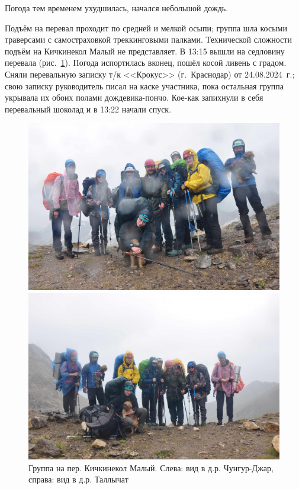Погода тем временем ухудшилась, начался небольшой дождь.

Подъём на перевал проходит по средней и мелкой осыпи; группа шла косыми траверсами с самостраховкой треккинговыми палками. Технической сложности подъём на Кичкинекол Малый не представляет.
В 13:15 вышли на седловину перевала (рис.~\ref{fig:DSC_0239}). Погода испортилась вконец, пошёл косой ливень с градом. Сняли перевальную записку т/к <<Крокус>> (г.~Краснодар) от 24.08.2024~г.; свою записку руководитель писал на каске участника, пока остальная группа укрывала их обоих полами дождевика-пончо. Кое-как запихнули в себя перевальный шоколад и в 13:22 начали спуск.


\begin{figure}[h!]
	\centering
	\begin{minipage}[h]{0.48\linewidth}
		\includegraphics[width=0.99\linewidth]{../pics/DSC_0239.jpg}
	\end{minipage}
	\quad
	\begin{minipage}[h]{0.48\linewidth}
		\includegraphics[width=0.99\linewidth]{../pics/DSC_0242.jpg}
	\end{minipage}
	\caption{Группа на пер. Кичкинекол Малый. Слева: вид в д.р. Чунгур-Джар, справа: вид в д.р. Таллычат}
	\label{fig:DSC_0239}
\end{figure}

